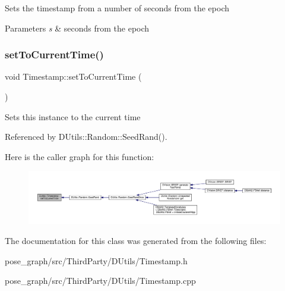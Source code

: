 Sets the timestamp from a number of seconds from the epoch 
\begin{DoxyParams}{Parameters}
{\em s} & seconds from the epoch \\
\hline
\end{DoxyParams}
\mbox{\label{classDUtils_1_1Timestamp_ae27c920f3833c104096213c6fb17f4d8}} 
\subsubsection{\texorpdfstring{set\+To\+Current\+Time()}{setToCurrentTime()}}
{\footnotesize\ttfamily void Timestamp\+::set\+To\+Current\+Time (\begin{DoxyParamCaption}{ }\end{DoxyParamCaption})}

Sets this instance to the current time 

Referenced by D\+Utils\+::\+Random\+::\+Seed\+Rand().

Here is the caller graph for this function\+:\nopagebreak
\begin{figure}[H]
\begin{center}
\leavevmode
\includegraphics[width=350pt]{classDUtils_1_1Timestamp_ae27c920f3833c104096213c6fb17f4d8_icgraph}
\end{center}
\end{figure}


The documentation for this class was generated from the following files\+:\begin{DoxyCompactItemize}
\item 
pose\+\_\+graph/src/\+Third\+Party/\+D\+Utils/Timestamp.\+h\item 
pose\+\_\+graph/src/\+Third\+Party/\+D\+Utils/Timestamp.\+cpp\end{DoxyCompactItemize}
